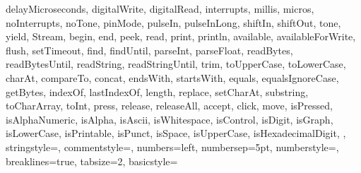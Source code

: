 {{			delayMicroseconds, digitalWrite, digitalRead, interrupts, millis, 
			micros, noInterrupts, noTone, pinMode, pulseIn, pulseInLong, shiftIn, 
			shiftOut, tone, yield, Stream, begin, end, peek, read, print, 
			println, available, availableForWrite, flush, setTimeout, find, 
			findUntil, parseInt, parseFloat, readBytes, readBytesUntil, readString, 
			readStringUntil, trim, toUpperCase, toLowerCase, charAt, compareTo, 
			concat, endsWith, startsWith, equals, equalsIgnoreCase, getBytes, 
			indexOf, lastIndexOf, length, replace, setCharAt, substring, 
			toCharArray, toInt, press, release, releaseAll, accept, click, move, 
			isPressed, isAlphaNumeric, isAlpha, isAscii, isWhitespace, isControl, 
			isDigit, isGraph, isLowerCase, isPrintable, isPunct, isSpace, 
			isUpperCase, isHexadecimalDigit, 
		},      
		stringstyle=\color{arduinoDarkBlue},    
		commentstyle=\color{arduinoGrey},    
		numbers=left,                    
		numbersep=5pt,                   
		numberstyle=\color{arduinoGrey},    
		breaklines=true,                    %
		tabsize=2,         
		basicstyle=\ttfamily  
	}